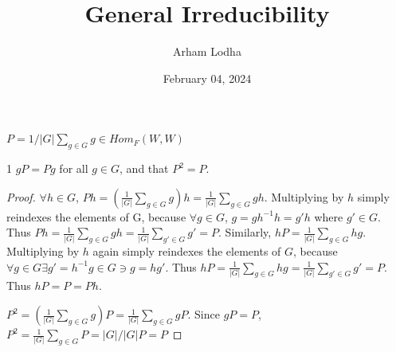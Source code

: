 \documentclass{article}
\begin{document}
\title{General Irreducibility}
\author{Arham Lodha}%
\date{February 04, 2024}%
\maketitle

$P = 1/|G| \sum_{g \in G} g \in Hom_F(W,W)$ 
\begin{PROB}{1}\label{Problem 1.}
    $gP = Pg$ for all $g \in G$, and that $P^2 = P$.
\end{PROB}
\begin{proof}
    $\forall h \in G$, $Ph = (\frac{1}{|G|} \sum_{g \in G} g) h = \frac{1}{|G|} \sum_{g \in G} gh$. Multiplying by $h$ simply reindexes the elements of G, because $\forall g \in G$, $g = gh^{-1}h = g'h$ where $g' \in G$. Thus $Ph = \frac{1}{|G|} \sum_{g \in G} gh = \frac{1}{|G|} \sum_{g' \in G} g' = P$. Similarly, $hP = \frac{1}{|G|} \sum_{g \in G} hg$. Multiplying by $h$ again simply reindexes the elements of $G$, because $\forall g \in G \exists g' = h^{-1}g \in G \ni g = hg'$. Thus $hP = \frac{1}{|G|} \sum_{g \in G} hg = \frac{1}{|G|} \sum_{g' \in G} g' = P$. Thus $hP = P = Ph$. 
    
    
    $P^2 = (\frac{1}{|G|} \sum_{g \in G} g)P = \frac{1}{|G|}\sum_{g \in G} gP$. Since $gP = P$, $P^2 = \frac{1}{|G|} \sum_{g \in G} P = |G|/|G| P = P$ 
\end{proof}

\bigskip
\end{document}
